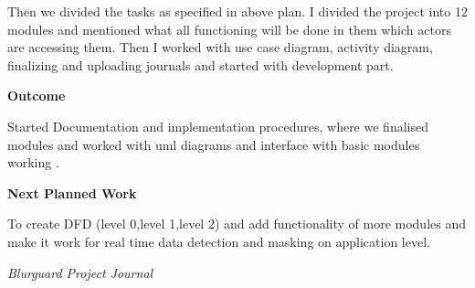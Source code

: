 \documentclass[12pt,a4paper]{article}
\begin{document}
Then we divided the tasks as specified in above plan. I divided the project into 12 modules and mentioned what all functioning will be done in them which actors are accessing them.
Then I worked with use case diagram, activity diagram, finalizing and uploading journals and started with development part.

\vspace{8pt}


\textbf{\large Outcome}

\vspace{4pt}

Started Documentation and implementation procedures, where we finalised modules and worked with uml diagrams and interface with basic modules working .

\vspace{8pt}


\textbf{\large Next Planned Work}

\vspace{4pt}

To create DFD (level 0,level 1,level 2) and add functionality of more modules and make it work for real time data detection and masking on application level. 

\vfill


\begin{flushright}
    \textit{Blurguard Project Journal}
\end{flushright}
\end{document}
